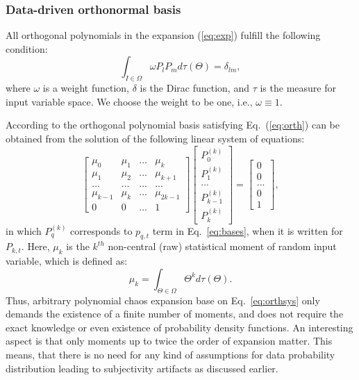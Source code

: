 

\subsubsection{Data-driven orthonormal basis}

All orthogonal polynomials in the expansion (\ref{eq:exp}) fulfill the following
condition:
%
\begin{equation}
\int_{I\in\Omega}\omega
P_{l}P_{m}d\tau(\Theta)=\delta_{lm},\label{eq:orth}\end{equation} where $\omega$
is a weight function, $\delta$ is the Dirac function, and $\tau$ is the measure
for input variable space. We choose the weight to be one, i.e.,
$\omega\equiv1$. 

According to \cite{oladyshkin2011concept} the orthogonal polynomial basis
satisfying Eq.~(\ref{eq:orth}) can be obtained from the solution of the
following linear system of equations: 
%
\begin{equation}
\left[\begin{array}{cccc}
\mu_{0} & \mu_{1} & ... & \mu_{k}\\
\mu_{1} & \mu_{2} & ... & \mu_{k+1}\\
... & ... & ... & ...\\
\mu_{k-1} & \mu_{k} & ... & \mu_{2k-1}\\
0 & 0 & ... & 1\end{array}\right]\left[\begin{array}{c}
P_{0}^{(k)}\\
P_{1}^{(k)}\\
...\\
P_{k-1}^{(k)}\\
P_{k}^{(k)}\end{array}\right]=\left[\begin{array}{c}
0\\
0\\
...\\
0\\
1\end{array}\right],\label{eq:orthsys}\end{equation} in which $P_{q}^{(k)}$
corresponds to $p_{q,t}$ term in Eq.~\ref{eq:bases}, when it is written for
$P_{k,t}$.
Here, $\mu_{k}$ is the $k^{th}$ non-central (raw) statistical moment of random
input variable, which is defined as:
%
\begin{equation}
\mu_{k}=\int_{\Theta\in\Omega}\Theta^{k}d\tau(\Theta).\label{eq:mnt}
\end{equation}
%
Thus, arbitrary polynomial chaos expansion base on Eq.~\ref{eq:orthsys} only
demands the existence of a finite number of moments, and does not require the
exact knowledge or even existence of probability density functions. An
interesting aspect is that only moments up to twice the order of expansion
matter. This means, that there is no need for any kind of assumptions for data
probability distribution leading to subjectivity artifacts as discussed earlier.

